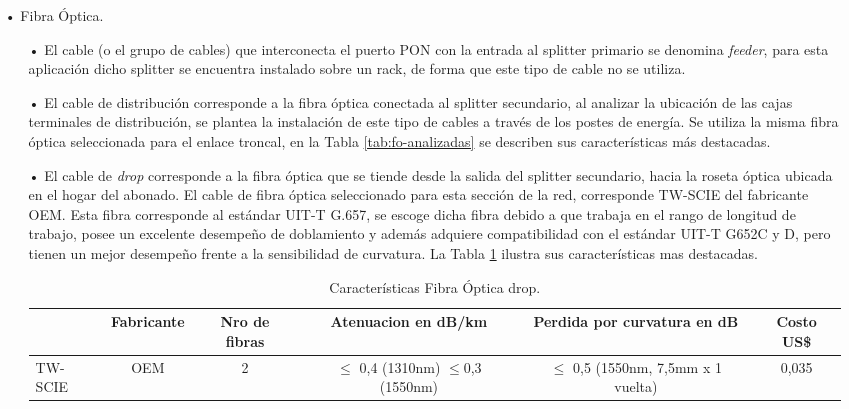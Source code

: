 \begin{enumerate}
\item[•]Fibra Óptica.




\begin{enumerate}
\item[•]El cable (o el grupo de cables) que interconecta el puerto PON con la entrada al splitter primario se denomina \textit{feeder}, para esta aplicación dicho splitter se encuentra instalado sobre un rack, de forma que este tipo de cable no se utiliza.

\item[•]El cable de distribución corresponde a la fibra óptica conectada al splitter secundario, al analizar la ubicación de las cajas terminales de distribución, se plantea la instalación de este tipo de cables a través de los postes de energía.
Se utiliza la misma fibra óptica seleccionada para el enlace troncal, en la Tabla \ref{tab:fo-analizadas} se describen sus características más destacadas.

\item[•]El cable de \textit{drop} corresponde a la fibra óptica que se tiende desde la salida del splitter secundario, hacia la roseta óptica ubicada en el hogar del abonado.
El cable de fibra óptica seleccionado para esta sección de la red, corresponde TW-SCIE del fabricante OEM. Esta fibra corresponde al estándar UIT-T G.657, se escoge dicha fibra debido a que trabaja en el rango de longitud de trabajo, posee un excelente desempeño de doblamiento y además adquiere compatibilidad con el estándar UIT-T G652C y D, pero tienen un mejor desempeño frente a la sensibilidad de curvatura. La Tabla \ref{tab:fo-drop} ilustra sus características mas destacadas.



\begin{table}[H]
  \tiny
  \centering
    \begin{tabular}{|l|c|c|c|c|c|}
    \hline
    \rowcolor[rgb]{ .773,  .851,  .945} \multicolumn{1}{|c|}{\textbf{Modelo}} & \textbf{Fabricante} & \textbf{Nro de fibras} & \textbf{Atenuacion en dB/km} & \textbf{Perdida por curvatura en dB} & \textbf{Costo US\$} \bigstrut\\
    \hline
        \textcolor[rgb]{ .004,  .004,  .004}{TW-SCIE} & OEM   & 2 & $\leq$ 0,4 (1310nm) $\leq$0,3 (1550nm) & $\leq$ 0,5 (1550nm, 7,5mm x 1 vuelta) & 0,035\cite{fo-drop} \bigstrut\\
    \hline
    \end{tabular}%
	\caption{Características Fibra Óptica drop.}
  \label{tab:fo-drop}%
\end{table}%






\end{enumerate}
\end{enumerate}
